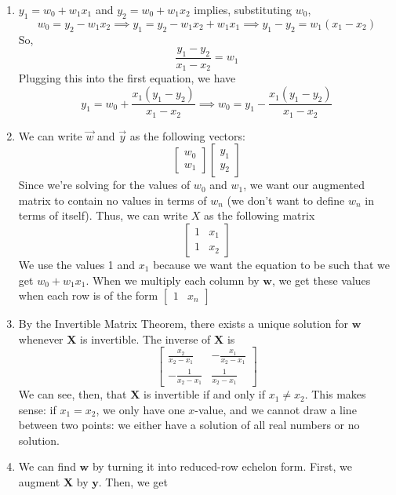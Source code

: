 \documentclass{harvardml}
\theoremstyle{definition}
\theoremstyle{plain}
\begin{document}
\begin{enumerate}
    \item $y_1 = w_0 + w_1x_1$ and $y_2 = w_0 + w_1x_2$ implies, substituting $w_0$, 
    $$
    w_0 = y_2 - w_1x_2 \implies y_1 = y_2 - w_1x_2 + w_1x_1 \implies y_1 - y_2 = w_1(x_1 - x_2)
    $$
    So, 
    $$
    \frac{y_1 - y_2}{x_1 - x_2} = w_1
    $$
    Plugging this into the first equation, we have
    $$
    y_1 = w_0 + \frac{x_1(y_1 - y_2)}{x_1 - x_2} \implies w_0 = y_1 - \frac{x_1(y_1 - y_2)}{x_1 - x_2}
    $$
    \item We can write $\vec{w}$ and $\vec{y}$ as the following vectors:
    $$
    \begin{bmatrix}
        w_0 \\ w_1
    \end{bmatrix}
    \begin{bmatrix}
        y_1 \\ y_2
    \end{bmatrix}
    $$
    Since we're solving for the values of $w_0$ and $w_1$, we want our augmented matrix to contain no values in terms of $w_n$ (we don't want to define $w_n$ in terms of itself). Thus, we can write $X$ as the following matrix
    $$
    \begin{bmatrix}
        1 & x_1 \\ 1 & x_2
    \end{bmatrix}$$
    We use the values 1 and $x_1$ because we want the equation to be such that we get $w_0 + w_1x_1$. When we multiply each column by $\mathbf{w}$, we get these values when each row is of the form $\begin{bmatrix}
        1 & x_n
    \end{bmatrix}$
    \item By the Invertible Matrix Theorem, there exists a unique solution for $\mathbf{w}$ whenever $\mathbf{X}$ is invertible. The inverse of $\mathbf{X}$ is 
    $$
    \begin{bmatrix}
    \frac{x_2}{x_2-x_1}&-\frac{x_1}{x_2-x_1}\\
    -\frac{1}{x_2-x_1}&\frac{1}{x_2-x_1}
    \end{bmatrix}
    $$
    We can see, then, that $\mathbf{X}$ is invertible if and only if $x_1 \neq x_2$. This makes sense: if $x_1 = x_2$, we only have one $x$-value, and we cannot draw a line between two points: we either have a solution of all real numbers or no solution.
    \item We can find $\mathbf{w}$ by turning it into reduced-row echelon form. First, we augment $\mathbf{X}$ by $\mathbf{y}$. Then, we get 

\end{enumerate}
\end{document}
